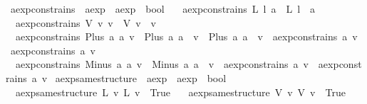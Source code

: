 \begin{isabellebody}
\isanewline
%
\endisadelimproof
\isanewline
{}\isamarkupfalse%
\ aexp{\isacharunderscore}constrains\ {\isacharcolon}{\isacharcolon}\ {\isachardoublequoteopen}aexp\ {\isasymRightarrow}\ aexp\ {\isasymRightarrow}\ bool{\isachardoublequoteclose}\ \isanewline
\ \ {\isachardoublequoteopen}aexp{\isacharunderscore}constrains\ {\isacharparenleft}L\ l{\isacharparenright}\ a\ {\isacharequal}\ {\isacharparenleft}L\ l\ {\isacharequal}\ a{\isacharparenright}{\isachardoublequoteclose}\ {\isacharbar}\isanewline
\ \ {\isachardoublequoteopen}aexp{\isacharunderscore}constrains\ {\isacharparenleft}V\ v{\isacharparenright}\ v{\isacharprime}\ {\isacharequal}\ {\isacharparenleft}V\ v\ {\isacharequal}\ v{\isacharprime}{\isacharparenright}{\isachardoublequoteclose}\ {\isacharbar}\isanewline
\ \ {\isachardoublequoteopen}aexp{\isacharunderscore}constrains\ {\isacharparenleft}Plus\ a{}\ a{}{\isacharparenright}\ v\ {\isacharequal}\ {\isacharparenleft}{\isacharparenleft}Plus\ a{}\ a{}{\isacharparenright}\ {\isacharequal}\ v\ {\isasymor}\ {\isacharparenleft}Plus\ a{}\ a{}{\isacharparenright}\ {\isacharequal}\ v\ {\isasymor}\ {\isacharparenleft}aexp{\isacharunderscore}constrains\ a{}\ v\ {\isasymor}\ aexp{\isacharunderscore}constrains\ a{}\ v{\isacharparenright}{\isacharparenright}{\isachardoublequoteclose}\ {\isacharbar}\isanewline
\ \ {\isachardoublequoteopen}aexp{\isacharunderscore}constrains\ {\isacharparenleft}Minus\ a{}\ a{}{\isacharparenright}\ v\ {\isacharequal}\ {\isacharparenleft}{\isacharparenleft}Minus\ a{}\ a{}{\isacharparenright}\ {\isacharequal}\ v\ {\isasymor}\ {\isacharparenleft}aexp{\isacharunderscore}constrains\ a{}\ v\ {\isasymor}\ aexp{\isacharunderscore}constrains\ a{}\ v{\isacharparenright}{\isacharparenright}{\isachardoublequoteclose}\isanewline
\isanewline
{}\isamarkupfalse%
\ aexp{\isacharunderscore}same{\isacharunderscore}structure\ {\isacharcolon}{\isacharcolon}\ {\isachardoublequoteopen}aexp\ {\isasymRightarrow}\ aexp\ {\isasymRightarrow}\ bool{\isachardoublequoteclose}\ \isanewline
\ \ {\isachardoublequoteopen}aexp{\isacharunderscore}same{\isacharunderscore}structure\ {\isacharparenleft}L\ v{\isacharparenright}\ {\isacharparenleft}L\ v{\isacharprime}{\isacharparenright}\ {\isacharequal}\ True{\isachardoublequoteclose}\ {\isacharbar}\isanewline
\ \ {\isachardoublequoteopen}aexp{\isacharunderscore}same{\isacharunderscore}structure\ {\isacharparenleft}V\ v{\isacharparenright}\ {\isacharparenleft}V\ v{\isacharprime}{\isacharparenright}\ {\isacharequal}\ True{\isachardoublequoteclose}\ {\isacharbar}\isanewline

\end{isabellebody}
